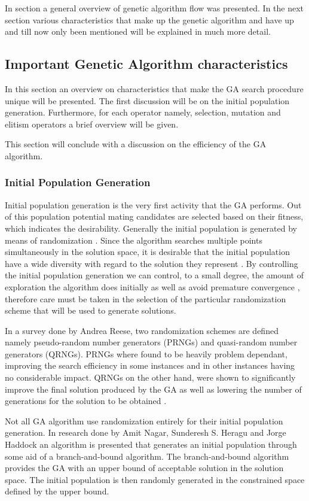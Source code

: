In section a general overview of genetic algorithm flow was presented. In the next section various characteristics that make up the genetic algorithm and have up and till now only been mentioned will be explained in much more detail.
\subsection{Important Genetic Algorithm characteristics}
In this section an overview on characteristics that make the GA search procedure unique will be presented. The first discussion will be on the initial population generation. Furthermore, for each operator namely, selection, mutation and elitism operators a brief overview will be given.

This section will conclude with a discussion on the efficiency of the GA algorithm.
\subsubsection{Initial Population Generation}
Initial population generation is the very first activity that the GA performs. Out of this population potential mating candidates are selected based on their fitness, which indicates the desirability. Generally the initial population is generated by means of randomization \cite{SelfAdaptiveGA}. Since the algorithm searches multiple points simultaneously in the solution space, it is desirable that the initial population have a wide diversity with regard to the solution they represent \cite{CombinedBranchBoundGA,DistributedHierarchicalGA}. By controlling the initial population generation we can control, to a small degree, the amount of exploration the algorithm does initially as well as avoid premature convergence \cite{CombinedBranchBoundGA}, therefore care must be taken in the selection of the particular randomization scheme that will be used to generate solutions.

In a survey done by Andrea Reese\cite{RandomNumberGA}, two randomization schemes are defined namely pseudo-random number generators (PRNGs) and quasi-random number generators (QRNGs). PRNGs where found to be heavily problem dependant, improving the search efficiency in some instances and in other instances having no considerable impact. QRNGs on the other hand, were shown to significantly improve the final solution produced by the GA as well as lowering the number of generations for the solution to be obtained \cite{RandomNumberGA}.

Not all GA algorithm use randomization entirely for their initial population generation. In research done by Amit Nagar, Sunderesh S. Heragu and Jorge Haddock\cite{CombinedBranchBoundGA} an algorithm is presented that generates an initial population through some aid of a branch-and-bound algorithm. The branch-and-bound algorithm provides the GA with an upper bound of acceptable solution in the solution space. The initial population is then randomly generated in the constrained space defined by the upper bound\cite{CombinedBranchBoundGA}.
